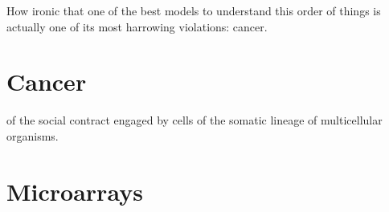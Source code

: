 \documentclass{tufte-book}
\begin{document}
How ironic that one of the best models to understand this order of things is
actually one of its most harrowing violations: cancer.\bigskip

\section{Cancer}

 of the social contract engaged by cells of
the somatic lineage of multicellular organisms.

\bigskip

\section{Microarrays}

\backmatter



% 
% 
\end{document}
